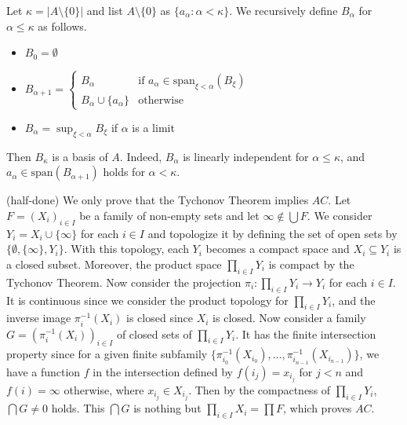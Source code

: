 \documentclass[12pt]{article}
\theoremstyle{definition}
\newenvironment{customthm}[1]
  {\renewcommand\theinnercustomthm{#1}\innercustomthm}
  {\endinnercustomthm}
\begin{document}
\begin{customthm}{I.12.5}
  Let $\kappa=|A\setminus\{0\}|$ and list $A\setminus\{0\}$ as $\{a_\alpha:\alpha<\kappa\}$. We recursively define $B_\alpha$ for $\alpha\leq\kappa$ as follows.
  \begin{itemize}
    \item $B_0=\emptyset$
    \item $B_{\alpha+1}=
      \begin{cases}
        B_\alpha & \text{if }a_\alpha\in\textrm{span}_{\xi<\alpha}(B_\xi) \\
        B_\alpha\cup\{a_\alpha\} & \text{otherwise}
      \end{cases}$
    \item $B_\alpha=\sup_{\xi<\alpha}B_\xi$ if $\alpha$ is a limit
  \end{itemize}
  Then $B_\kappa$ is a basis of $A$. Indeed, $B_\alpha$ is linearly independent for $\alpha\leq\kappa$, and $a_\alpha\in\textrm{span}(B_{\alpha+1})$ holds for $\alpha<\kappa$.
\end{customthm}

\begin{customthm}{I.12.6} (half-done)
  We only prove that the Tychonov Theorem implies $AC$. Let $F=(X_i)_{i\in I}$ be a family of non-empty sets and let $\infty\not\in\bigcup F$. We consider $Y_i=X_i\cup\{\infty\}$ for each $i\in I$ and topologize it by defining the set of open sets by $\{\emptyset,\{\infty\},Y_i\}$. With this topology, each $Y_i$ becomes a compact space and $X_i\subseteq Y_i$ is a closed subset. Moreover, the product space $\prod_{i\in I}Y_i$ is compact by the Tychonov Theorem. Now consider the projection $\pi_i:\prod_{i\in I}Y_i\rightarrow Y_i$ for each $i\in I$. It is continuous since we consider the product topology for $\prod_{i\in I}Y_i$, and the inverse image $\pi_i^{-1}(X_i)$ is closed since $X_i$ is closed. Now consider a family $G=(\pi_i^{-1}(X_i))_{i\in I}$ of closed sets of $\prod_{i\in I}Y_i$. It has the finite intersection property since for a given finite subfamily $\{\pi_{i_0}^{-1}(X_{i_0}),\ldots,\pi_{i_{n-1}}^{-1}(X_{i_{n-1}})\}$, we have a function $f$ in the intersection defined by $f(i_j)=x_{i_j}$ for $j<n$ and $f(i)=\infty$ otherwise, where $x_{i_j}\in X_{i_j}$. Then by the compactness of $\prod_{i\in I}Y_i$, $\bigcap G\neq0$ holds. This $\bigcap G$ is nothing but $\prod_{i\in I}X_i=\prod F$, which proves $AC$.
\end{customthm}
\end{document}
